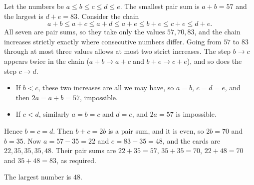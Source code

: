 Let the numbers be $a\le b\le c\le d\le e$. The smallest pair sum is $a+b=57$ and the largest is $d+e=83$. Consider the chain
\[a+b\le a+c\le a+d\le a+e\le b+e\le c+e\le d+e.\]
All seven are pair sums, so they take only the values $57,70,83$, and the chain increases strictly exactly where consecutive numbers differ. Going from $57$ to $83$ through at most three values allows at most two strict increases. The step $b\to c$ appears twice in the chain ($a+b\to a+c$ and $b+e\to c+e$), and so does the step $c\to d$.
\begin{itemize}
\item If $b<c$, these two increases are all we may have, so $a=b$, $c=d=e$, and then $2a=a+b=57$, impossible.
\item If $c<d$, similarly $a=b=c$ and $d=e$, and $2a=57$ is impossible.
\end{itemize}
Hence $b=c=d$. Then $b+c=2b$ is a pair sum, and it is even, so $2b=70$ and $b=35$. Now $a=57-35=22$ and $e=83-35=48$, and the cards are $22,35,35,35,48$. Their pair sums are $22+35=57$, $35+35=70$, $22+48=70$ and $35+48=83$, as required.

The largest number is $\boxed{48}$.
